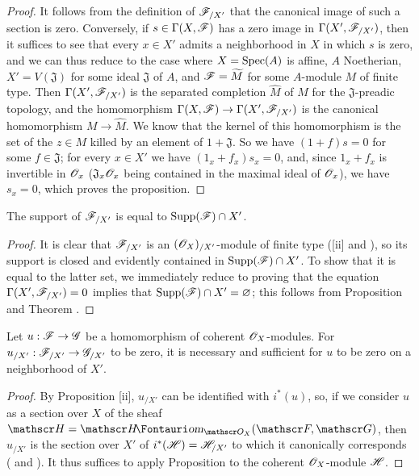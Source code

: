 \begin{proof}
\label{proof-1.10.8.11}
It follows from the definition of $\mathscr{F}_{/X'}$ that the canonical image of such a section is zero.
Conversely, if $s\in\Gamma(X,\mathscr{F})$ has a zero image in $\Gamma(X',\mathscr{F}_{/X'})$, then it suffices to see that every $x\in X'$ admits a neighborhood in $X$ in which $s$ is zero, and we can thus reduce to the case where $X=\operatorname{Spec}(A)$ is affine, $A$ Noetherian, $X'=V(\mathfrak{J})$ for some ideal $\mathfrak{J}$ of $A$, and $\mathscr{F}=\widetilde{M}$ for some $A$-module $M$ of finite type.
Then $\Gamma(X',\mathscr{F}_{/X'})$ is the separated completion $\widehat{M}$ of $M$ for the $\mathfrak{J}$-preadic topology, and the homomorphism $\Gamma(X,\sh{F})\to\Gamma(X',\sh{F}_{/X'})$ is the canonical homomorphism $M\to\widehat{M}$.
We know  that the kernel of this homomorphism is the set of the $z\in M$ killed by an element of $1+\mathfrak{J}$.
So we have $(1+f)s=0$ for some $f\in\mathfrak{J}$; for every $x\in X'$ we have $(1_x+f_x)s_x=0$, and, since $1_x+f_x$ is invertible in $\mathscr{O}_x$ ($\mathfrak{J}_x\mathscr{O}_x$ being contained in the maximal ideal of $\mathscr{O}_x$), we have $s_x=0$, which proves the proposition.
\end{proof}

\begin{corollary}[10.8.12]
\label{1.10.8.12}
The support of $\mathscr{F}_{/X'}$ is equal to $\operatorname{Supp}(\mathscr{F})\cap X'$.
\end{corollary}

\begin{proof}
\label{proof-1.10.8.12}
It is clear that $\mathscr{F}_{/X'}$ is an $(\mathscr{O}_X)_{/X'}$-module of finite type ([ii] and ),
so its support is closed  and evidently contained in $\operatorname{Supp}(\mathscr{F})\cap X'$.
To show that it is equal to the latter set, we immediately reduce to proving that the equation $\Gamma(X',\mathscr{F}_{/X'})=0$ implies that $\operatorname{Supp}(\mathscr{F})\cap X'=\varnothing$; this follows from Proposition  and Theorem .
\end{proof}

\begin{corollary}[10.8.13]
\label{1.10.8.13}
Let $u:\sh{F}\to\sh{G}$ be a homomorphism of coherent $\mathscr{O}_X$-modules.
For $u_{/X'}:\sh{F}_{/X'}\to\sh{G}_{/X'}$ to be zero, it is necessary and sufficient for $u$ to be zero on a neighborhood of $X'$.
\end{corollary}

\begin{proof}
\label{proof-1.10.8.13}
By Proposition [ii], $u_{/X'}$ can be identified with $i^*(u)$, so, if we consider $u$ as a section over $X$ of the sheaf $\sh{H}=\shHom_{\sh{O}_X}(\sh{F},\sh{G})$, then $u_{/X'}$ is the section over $X'$ of $i^*(\mathscr{H})=\mathscr{H}_{/X'}$ to which it canonically corresponds ( and ).
It thus suffices to apply Proposition  to the coherent $\mathscr{O}_X$-module $\mathscr{H}$.
\end{proof}

